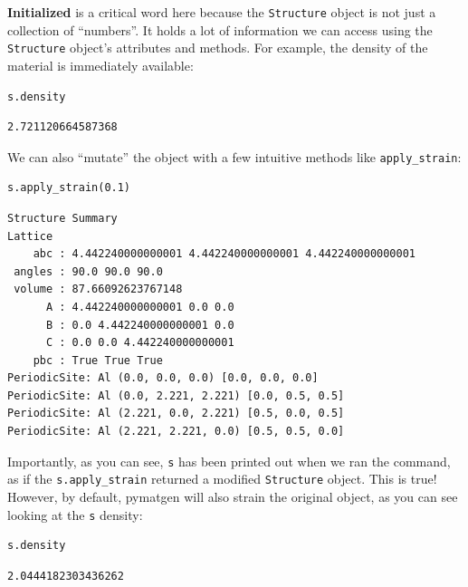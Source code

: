 \textbf{Initialized} is a critical word here because the
\texttt{Structure} object is not just a collection of
``numbers''. It holds a lot of information we can access using the
\texttt{Structure} object's attributes and methods. For
example, the density of the material is immediately available:

\begin{verbatim}
s.density
\end{verbatim}

\begin{verbatim}
2.721120664587368
\end{verbatim}

We can also ``mutate'' the object with a few intuitive methods like
\texttt{apply\_strain}:

\begin{verbatim}
s.apply_strain(0.1)
\end{verbatim}

\begin{verbatim}
Structure Summary
Lattice
    abc : 4.442240000000001 4.442240000000001 4.442240000000001
 angles : 90.0 90.0 90.0
 volume : 87.66092623767148
      A : 4.442240000000001 0.0 0.0
      B : 0.0 4.442240000000001 0.0
      C : 0.0 0.0 4.442240000000001
    pbc : True True True
PeriodicSite: Al (0.0, 0.0, 0.0) [0.0, 0.0, 0.0]
PeriodicSite: Al (0.0, 2.221, 2.221) [0.0, 0.5, 0.5]
PeriodicSite: Al (2.221, 0.0, 2.221) [0.5, 0.0, 0.5]
PeriodicSite: Al (2.221, 2.221, 0.0) [0.5, 0.5, 0.0]
\end{verbatim}

Importantly, as you can see, \texttt{s} has been
printed out when we ran the command, as if the
\texttt{s.apply\_strain} returned a modified
\texttt{Structure} object. This is true! However, by
default, pymatgen will also strain the original object, as you can see
looking at the \texttt{s} density:

\begin{verbatim}
s.density
\end{verbatim}

\begin{verbatim}
2.0444182303436262
\end{verbatim}

